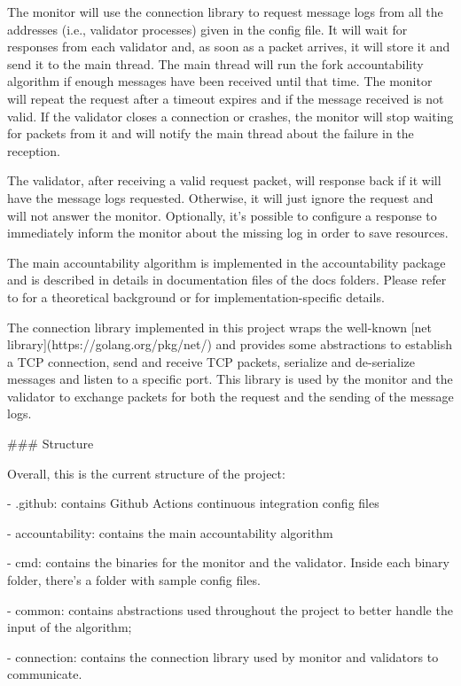 \documentclass[a4paper,11pt,oneside]{report}
\begin{document}
\begin{markdown}
The monitor will use the connection library to request message logs from all the addresses (i.e., validator processes) given in the config file. It will wait for responses from each validator and, as soon as a packet arrives, it will store it and send it to the main thread. The main thread will run the fork accountability algorithm if enough messages have been received until that time.
The monitor will repeat the request after a timeout expires and if the message received is not valid. If the validator closes a connection or crashes, the monitor will stop waiting for packets from it and will notify the main thread about the failure in the reception.

The validator, after receiving a valid request packet, will response back if it will have the message logs requested. Otherwise, it will just ignore the request and will not answer the monitor. Optionally, it's possible to configure a response to immediately inform the monitor about the missing log in order to save resources.

The main accountability algorithm is implemented in the accountability package and is described in details in documentation files of the docs folders. Please refer to for a theoretical background or for implementation-specific details.

The connection library implemented in this project wraps the well-known [net library](https://golang.org/pkg/net/) and provides some abstractions to establish a TCP connection, send and receive TCP packets, serialize and de-serialize messages and listen to a specific port.
This library is used by the monitor and the validator to exchange packets for both the request and the sending of the message logs.

### Structure

Overall, this is the current structure of the project:
    
- .github: contains Github Actions continuous integration config files

- accountability: contains the main accountability algorithm

- cmd: contains the binaries for the monitor and the validator. Inside each binary folder, there's a folder with sample config files. 

- common: contains abstractions used throughout the project to better handle the input of the algorithm;

- connection: contains the connection library used by monitor and validators to communicate.


\end{markdown}
\end{document}
